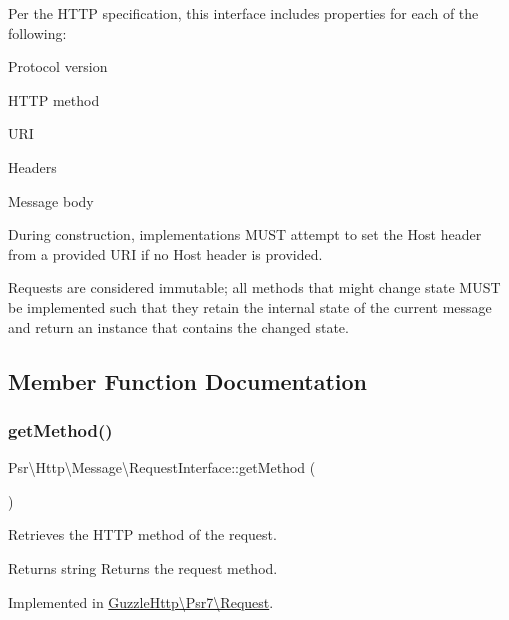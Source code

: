 Per the H\+T\+TP specification, this interface includes properties for each of the following\+:


\begin{DoxyItemize}
\item Protocol version
\item H\+T\+TP method
\item U\+RI
\item Headers
\item Message body
\end{DoxyItemize}

During construction, implementations M\+U\+ST attempt to set the Host header from a provided U\+RI if no Host header is provided.

Requests are considered immutable; all methods that might change state M\+U\+ST be implemented such that they retain the internal state of the current message and return an instance that contains the changed state. 

\subsection{Member Function Documentation}
\mbox{\label{interfacePsr_1_1Http_1_1Message_1_1RequestInterface_a1aceab5bc5a2067500f4a80ac314fbc9}} 
\subsubsection{\texorpdfstring{get\+Method()}{getMethod()}}
{\footnotesize\ttfamily Psr\textbackslash{}\+Http\textbackslash{}\+Message\textbackslash{}\+Request\+Interface\+::get\+Method (\begin{DoxyParamCaption}{ }\end{DoxyParamCaption})}

Retrieves the H\+T\+TP method of the request.

\begin{DoxyReturn}{Returns}
string Returns the request method. 
\end{DoxyReturn}


Implemented in \hyperlink{classGuzzleHttp_1_1Psr7_1_1Request_a4eafa27a3768e0d353882e9aad075709}{Guzzle\+Http\textbackslash{}\+Psr7\textbackslash{}\+Request}.


